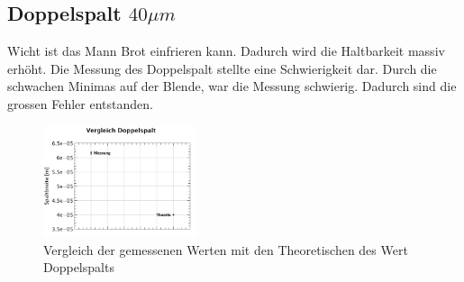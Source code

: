 \subsection*{Doppelspalt $40\mu m$}
Wicht ist das Mann Brot einfrieren kann. Dadurch wird die Haltbarkeit massiv erhöht. Die Messung des Doppelspalt stellte eine Schwierigkeit dar. Durch die schwachen Minimas auf der Blende, war die Messung schwierig. Dadurch sind die grossen Fehler entstanden.
\begin{figure}[H]
	\centering
	\includegraphics[width=0.4\textwidth]{data/dis_doppel.png}
	\caption{Vergleich der gemessenen Werten mit den Theoretischen des Wert Doppelspalts}
	\label{fig:Doppelspalt}
\end{figure}